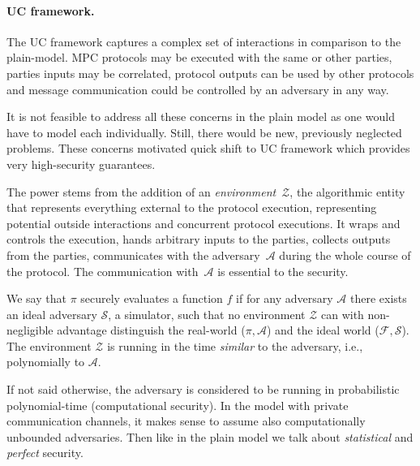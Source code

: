 \documentclass[
  digital, %
  twoside, %
  table,   %
  lof,     %
  lot,     %
]{fithesis3}
\newcounter{ph4_show_guides}
\theoremstyle{definition}
\theoremstyle{remark}
\begin{document}

\paragraph{UC framework.}
The UC framework captures a complex set of interactions in comparison to the plain-model. MPC protocols may be executed with the same or other parties, parties inputs may be correlated, protocol outputs can be used by other protocols and message communication could be controlled by an adversary in any way. 

It is not feasible to address all these concerns in the plain model as one would have to model each individually. Still, there would be new, previously neglected problems. These concerns motivated quick shift to UC framework which provides very high-security guarantees.

The power stems from the addition of an \emph{environment}~$\mathcal{Z}$, the algorithmic entity that represents everything external to the protocol execution, representing potential outside interactions and concurrent protocol executions. It wraps and controls the execution, hands arbitrary inputs to the parties, collects outputs from the parties, communicates with the adversary~$\mathcal{A}$ during the whole course of the protocol. The communication with~$\mathcal{A}$ is essential to the security.


We say that $\pi$ securely evaluates a function $f$ if for any adversary $\mathcal{A}$ there exists an ideal adversary $\mathcal{S}$, a simulator, such that no environment $\mathcal{Z}$ can with non-negligible advantage distinguish the real-world ($\pi, \mathcal{A}$) and the ideal world ($\mathcal{F}, \mathcal{S}$). The environment $\mathcal{Z}$ is running in the time \emph{similar} to the adversary, i.e., polynomially to $\mathcal{A}$.

If not said otherwise, the adversary is considered to be running in probabilistic polynomial-time (computational security). In the model with private communication channels, it makes sense to assume also computationally unbounded adversaries. Then like in the plain model we talk about \emph{statistical} and \emph{perfect} security.
\end{document}
